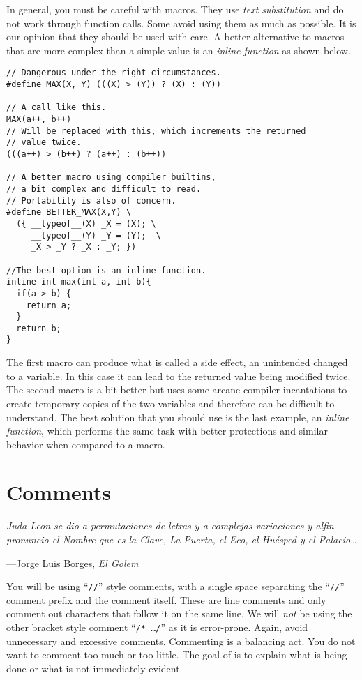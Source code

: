 \documentclass[11pt]{article}
\begin{document}
In general, you must be careful with macros. They use \emph{text substitution} and
do not work through function calls. Some avoid using them as much as possible. It is
our opinion that they should be used with care. A better alternative to macros that are
more complex than a simple value is an \emph{inline function} as shown below.

\begin{lstlisting}
// Dangerous under the right circumstances.
#define MAX(X, Y) (((X) > (Y)) ? (X) : (Y))

// A call like this.
MAX(a++, b++)
// Will be replaced with this, which increments the returned
// value twice.
(((a++) > (b++) ? (a++) : (b++))

// A better macro using compiler builtins,
// a bit complex and difficult to read.
// Portability is also of concern.
#define BETTER_MAX(X,Y) \
  ({ __typeof__(X) _X = (X); \
     __typeof__(Y) _Y = (Y);  \
     _X > _Y ? _X : _Y; })

//The best option is an inline function.
inline int max(int a, int b){
  if(a > b) {
    return a;
  }
  return b;
}
\end{lstlisting}

The first macro can produce what is called a side effect, an unintended changed
to a variable. In this case it can lead to the returned value being modified twice.
The second macro is a bit better but uses some arcane compiler incantations to
create temporary copies of the two variables and therefore can be difficult to
understand. The best solution that you should use is the last example, an
\emph{inline function}, which performs the same task with better protections and
similar behavior when compared to a macro.

\section{Comments}
\textwidth
\epigraph{\emph{
Juda Leon se dio a permutaciones
de letras y a complejas variaciones
y alfin pronuncio el Nombre que es la Clave, La Puerta, el Eco, el Hu\'esped y
el Palacio\ldots}}{---Jorge Luis Borges, \emph{El Golem}}

\noindent You will be using ``\texttt{//}'' style comments, with a single space
separating the ``\texttt{//}''
comment prefix and the comment itself. These are line comments and only comment
out characters that follow it on the same line. We will \emph{not} be using the
other bracket style comment ``\texttt{/* \ldots  */}'' as it is error-prone.
Again, avoid unnecessary and excessive comments. Commenting is a balancing act.
You do not want to comment too much or too little. The goal of is to explain
what is being done or what is not immediately evident.
\end{document}
